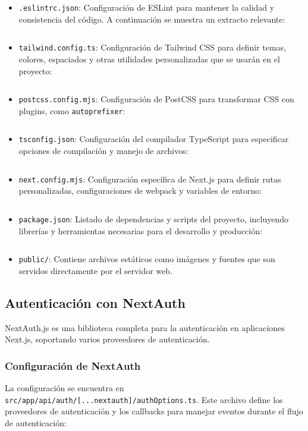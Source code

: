 \begin{itemize}
  \item \texttt{.eslintrc.json}: Configuración de ESLint para mantener la calidad y consistencia del código. A continuación se muestra un extracto relevante:
  \inputminted{json}{../client/.eslintrc.json}

  \item \texttt{tailwind.config.ts}: Configuración de Tailwind CSS para definir temas, colores, espaciados y otras utilidades personalizadas que se usarán en el proyecto:
  \inputminted{typescript}{../client/tailwind.config.ts}

  \item \texttt{postcss.config.mjs}: Configuración de PostCSS para transformar CSS con plugins, como \texttt{autoprefixer}:
  \inputminted{javascript}{../client/postcss.config.mjs}

  \item \texttt{tsconfig.json}: Configuración del compilador TypeScript para especificar opciones de compilación y manejo de archivos:
  \inputminted{json}{../client/tsconfig.json}

  \item \texttt{next.config.mjs}: Configuración específica de Next.js para definir rutas personalizadas, configuraciones de webpack y variables de entorno:
  \inputminted{javascript}{../client/next.config.mjs}

  \item \texttt{package.json}: Listado de dependencias y scripts del proyecto, incluyendo librerías y herramientas necesarias para el desarrollo y producción:
  \inputminted{json}{../client/package.json}

  \item \texttt{public/}: Contiene archivos estáticos como imágenes y fuentes que son servidos directamente por el servidor web.
\end{itemize}

\subsection{Autenticación con NextAuth}
NextAuth.js es una biblioteca completa para la autenticación en aplicaciones Next.js, soportando varios proveedores de autenticación. 

\subsubsection{Configuración de NextAuth}
La configuración se encuentra en \texttt{src/app/api/auth/[...nextauth]/authOptions.ts}. Este archivo define los proveedores de autenticación y los callbacks para manejar eventos durante el flujo de autenticación:
\inputminted{typescript}{../client/src/app/api/auth/\[...nextauth\]/authOptions.ts}

